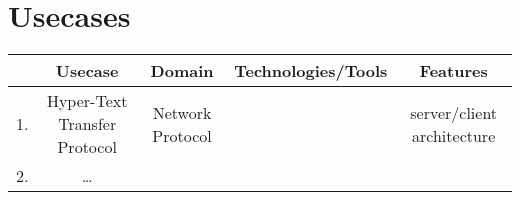 \section{Usecases}

\begin{longtable}{|c|c|c|c|c|}
	\hline
	& Usecase & Domain & Technologies/Tools & Features\\
	\hline
	1. & Hyper-Text Transfer Protocol & Network Protocol & & server/client architecture\\
	\hline
	2. & \dots &&&\\
	\hline
\end{longtable}

